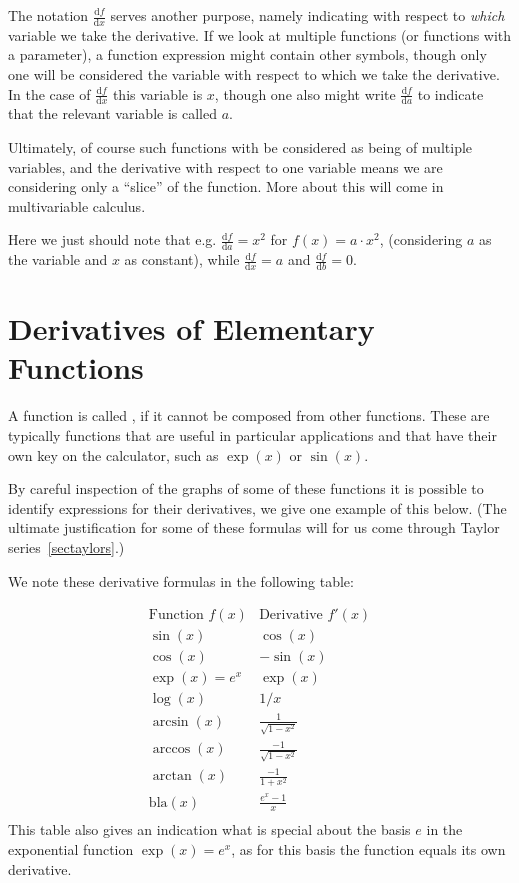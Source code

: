 \begin{note}
The notation $\displaystyle\frac{\mbox{d}f}{\mbox{d}x}$ serves another
purpose, namely indicating with respect to {\em which} variable we take the
derivative. If we look at multiple functions (or functions with a
parameter), a function expression might contain other symbols, though only
one will be considered the variable with respect to which we take the
derivative. In the case of $\displaystyle\frac{\mbox{d}f}{\mbox{d}x}$ this
variable is $x$, though one also might write
$\displaystyle\frac{\mbox{d}f}{\mbox{d}a}$ to indicate that the relevant
variable is called $a$.

Ultimately, of course such functions with be considered as being of multiple
variables, and the derivative with respect to one variable means we are
considering only a ``slice'' of the function. More about this will come in
multivariable calculus.

Here we just should note that e.g.
$\displaystyle\frac{\mbox{d}f}{\mbox{d}a}=x^2$ for $f(x)=a\cdot x^2$,
(considering $a$ as the variable and $x$ as constant), while
$\displaystyle\frac{\mbox{d}f}{\mbox{d}x}=a$ and
$\displaystyle\frac{\mbox{d}f}{\mbox{d}b}=0$.
\end{note}

\section{Derivatives of Elementary Functions}
\label{derelem}

A function is called , if it
cannot be composed from other functions. These are typically functions
that are useful in particular applications and that have their own key on the calculator, such as $\exp(x)$ or $\sin(x)$.

By careful inspection of the graphs of some of these functions it is possible
to identify expressions for their derivatives, we give one example of this
below. (The ultimate justification
for some of these formulas will for us come through Taylor
series~\ref{sectaylors}.)

We note these derivative formulas in the following table:

\[
\begin{array}{c|c}
\mbox{Function $f(x)$}&\mbox{Derivative $f'(x)$}\\
\hline
\sin(x)&\cos(x)\\
\cos(x)&-\sin(x)\\
\exp(x)=e^x&\exp(x)\\
\log(x)&1/x\\
\arcsin(x)&\frac{1}{\sqrt{1-x^2}}\\
\arccos(x)&\frac{-1}{\sqrt{1-x^2}}\\
\arctan(x)&\frac{-1}{1+x^2}\\
\mbox{bla}(x)&\frac{e^x-1}{x}\\
\end{array}
\]
This table also gives an indication what is special about the basis $e$ in
the exponential function $\exp(x)=e^x$, as for this basis the function equals
its own derivative.


